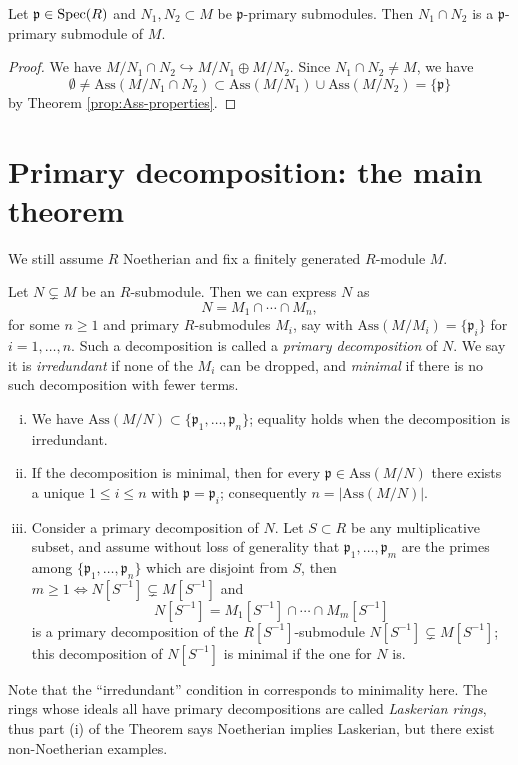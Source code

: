 \begin{lemma}\label{prop:intersection-primary}
	Let $\mathfrak{p} \in \operatorname{Spec}(R)$ and $N_1, N_2 \subset M$ be $\mathfrak{p}$-primary submodules. Then $N_1 \cap N_2$ is a $\mathfrak{p}$-primary submodule of $M$.
\end{lemma}
\begin{proof}
	We have $M/N_1 \cap N_2 \hookrightarrow M/N_1 \oplus M/N_2$. Since $N_1 \cap N_2 \neq M$, we have
	\[ \emptyset \neq \text{Ass}(M/N_1 \cap N_2) \subset \text{Ass}(M/N_1) \cup \text{Ass}(M/N_2) = \{\mathfrak{p}\} \]
	by Theorem \ref{prop:Ass-properties}.
\end{proof}

\section{Primary decomposition: the main theorem}
We still assume $R$ Noetherian and fix a finitely generated $R$-module $M$.

\begin{theorem}\label{prop:primary-decomp}
	Let $N \subsetneq M$ be an $R$-submodule. Then we can express $N$ as
	\[ N = M_1 \cap \cdots \cap M_n, \]
	for some $n \geq 1$ and primary $R$-submodules $M_i$, say with $\text{Ass}(M/M_i) = \{\mathfrak{p}_i\}$ for $i = 1, \ldots, n$. Such a decomposition is called a \emph{primary decomposition} of $N$. We say it is \emph{irredundant} if none of the $M_i$ can be dropped, and \emph{minimal} if there is no such decomposition with fewer terms.
	\begin{enumerate}[(i)]
		\item We have $\text{Ass}(M/N) \subset \{ \mathfrak{p}_1, \ldots, \mathfrak{p}_n \}$; equality holds when the decomposition is irredundant.
		\item If the decomposition is minimal, then for every $\mathfrak{p} \in \text{Ass}(M/N)$ there exists a unique $1 \leq i \leq n$ with $\mathfrak{p} = \mathfrak{p}_i$; consequently $n = |\text{Ass}(M/N)|$.
		\item Consider a primary decomposition of $N$. Let $S \subset R$ be any multiplicative subset, and assume without loss of generality that $\mathfrak{p}_1, \ldots, \mathfrak{p}_m$ are the primes among $\{\mathfrak{p}_1, \ldots, \mathfrak{p}_n \}$ which are disjoint from $S$, then $m \geq 1 \iff N[S^{-1}] \subsetneq M[S^{-1}]$ and
		\[ N[S^{-1}] = M_1[S^{-1}] \cap \cdots \cap M_m[S^{-1}] \]
		is a primary decomposition of the $R[S^{-1}]$-submodule $N[S^{-1}] \subsetneq M[S^{-1}]$; this decomposition of $N[S^{-1}]$ is minimal if the one for $N$ is.
	\end{enumerate}
\end{theorem}
Note that the ``irredundant'' condition in \cite[(8.D)]{Mat80} corresponds to minimality here. The rings whose ideals all have primary decompositions are called \emph{Laskerian rings}, thus part (i) of the Theorem says Noetherian implies Laskerian, but there exist non-Noetherian examples.

